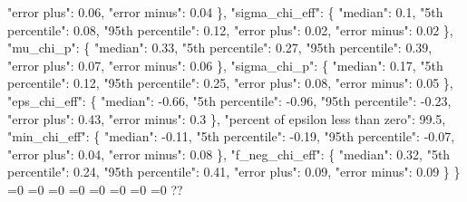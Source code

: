 {{        "error plus": 0.06, %
        "error minus": 0.04%
      \}, %
      "sigma\_chi\_eff": \{%
        "median": 0.1, %
        "5th percentile": 0.08, %
        "95th percentile": 0.12, %
        "error plus": 0.02, %
        "error minus": 0.02%
      \}, %
      "mu\_chi\_p": \{%
        "median": 0.33, %
        "5th percentile": 0.27, %
        "95th percentile": 0.39, %
        "error plus": 0.07, %
        "error minus": 0.06%
      \}, %
      "sigma\_chi\_p": \{%
        "median": 0.17, %
        "5th percentile": 0.12, %
        "95th percentile": 0.25, %
        "error plus": 0.08, %
        "error minus": 0.05%
      \}, %
      "eps\_chi\_eff": \{%
        "median": {-}0.66, %
        "5th percentile": {-}0.96, %
        "95th percentile": {-}0.23, %
        "error plus": 0.43, %
        "error minus": 0.3%
      \}, %
      "percent of epsilon less than zero": 99.5, %
      "min\_chi\_eff": \{%
        "median": {-}0.11, %
        "5th percentile": {-}0.19, %
        "95th percentile": {-}0.07, %
        "error plus": 0.04, %
        "error minus": 0.08%
      \}, %
      "f\_neg\_chi\_eff": \{%
        "median": 0.32, %
        "5th percentile": 0.24, %
        "95th percentile": 0.41, %
        "error plus": 0.09, %
        "error minus": 0.09%
      \}%
    \}}%
  \else%
    \ifnum{}=0%
      \let\EpsSkewNormalChiEff@I@out\EpsSkewNormalChiEff@III%
    \else%
      \ifnum{}=0%
      \let\EpsSkewNormalChiEff@I@out\EpsSkewNormalChiEff@IV%
    \else%
      \ifnum{}=0%
      \let\EpsSkewNormalChiEff@I@out\EpsSkewNormalChiEff@V%
    \else%
      \ifnum{}=0%
      \let\EpsSkewNormalChiEff@I@out\EpsSkewNormalChiEff@VI%
    \else%
      \ifnum{}=0%
      \let\EpsSkewNormalChiEff@I@out\EpsSkewNormalChiEff@VII%
    \else%
      \ifnum{}=0%
      \def\EpsSkewNormalChiEff@I@out{%
    99.5}%
    \else%
      \ifnum{}=0%
      \let\EpsSkewNormalChiEff@I@out\EpsSkewNormalChiEff@VIII%
    \else%
      \ifnum{}=0%
      \let\EpsSkewNormalChiEff@I@out\EpsSkewNormalChiEff@IX%
    \else%
      \def\EpsSkewNormalChiEff@I@out{%
    ??}%
    \fi\fi\fi\fi\fi\fi\fi\fi
  \fi
  \EpsSkewNormalChiEff@I@out
}\newcommand\EpsSkewNormalChiEff@II[1][all]{%
  \ifnum\pdfstrcmp{#1}{all}=0%
    \def\EpsSkewNormalChiEff@II@out{%
    \{%
      "chi\_eff": \{%
        "median": 0.04, %
        "5th percentile": {-}0.09, %
        "95th percentile": 0.26, %
}}
